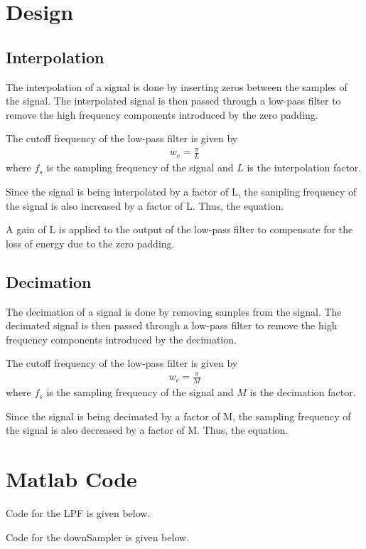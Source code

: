 \documentclass[a4paper,12pt]{article}
\begin{document}
\section*{Design}
\subsection*{Interpolation}
The interpolation of a signal is done by inserting zeros between the samples of the signal.
The interpolated signal is then passed through a low-pass filter to remove the high frequency components introduced by the zero padding.

The cutoff frequency of the low-pass filter is given by
\begin{align*}
    w_c = \frac{\pi}{L}
\end{align*}
where $f_s$ is the sampling frequency of the signal and $L$ is the interpolation factor.

Since the signal is being interpolated by a factor of L, the sampling frequency of the signal is also increased by a factor of L.
Thus, the equation.

A gain of L is applied to the output of the low-pass filter to compensate for the loss of energy due to the zero padding.

\subsection*{Decimation}
The decimation of a signal is done by removing samples from the signal.
The decimated signal is then passed through a low-pass filter to remove the high frequency components introduced by the decimation.

The cutoff frequency of the low-pass filter is given by
\begin{align*}
    w_c = \frac{\pi}{M}
\end{align*}
where $f_s$ is the sampling frequency of the signal and $M$ is the decimation factor.

Since the signal is being decimated by a factor of M, the sampling frequency of the signal is also decreased by a factor of M.
Thus, the equation.

\section*{Matlab Code}
Code for the LPF is given below.


Code for the downSampler is given below.

\end{document}
